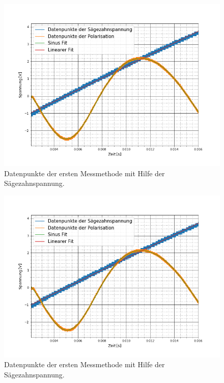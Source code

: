\begin{figure}[ht]
	\includegraphics[scale=0.5]{Bild/V1_5}
	\centering
	\caption[Plot zu Versuchsteil 1 Nr.5]{Datenpunkte der ersten Messmethode mit Hilfe der Sägezahnspannung.}
\end{figure}
\begin{figure}[ht]
	\includegraphics[scale=0.5]{Bild/V1_6}
	\centering
	\caption[Plot zu Versuchsteil 1 Nr.6]{Datenpunkte der ersten Messmethode mit Hilfe der Sägezahnspannung.}
\end{figure}
